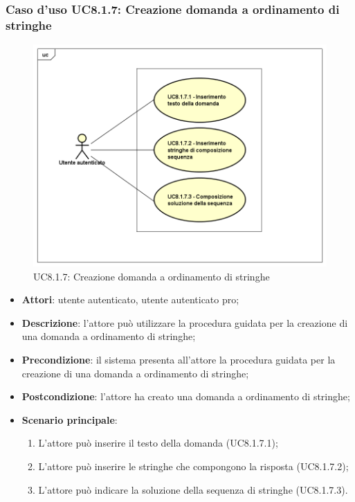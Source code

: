 \subsubsection{Caso d'uso UC8.1.7: Creazione domanda a ordinamento di stringhe}
	\label{UC8.1.7}
	\begin{figure}[h]
		\centering
			\includegraphics[scale=0.45,keepaspectratio]{UML/UC8_1_7.png}
		\caption{UC8.1.7: Creazione domanda a ordinamento di stringhe}
	\end{figure}
	\FloatBarrier
\begin{itemize}
	\item\textbf{Attori}: utente autenticato, utente autenticato pro;
	\item\textbf{Descrizione}: l'attore può utilizzare la procedura guidata per la creazione di una domanda a ordinamento di stringhe;
	\item \textbf{Precondizione}: il sistema presenta all'attore la procedura guidata per la creazione di una domanda a ordinamento di stringhe; 
	\item\textbf{Postcondizione}: l'attore ha creato una domanda a ordinamento di stringhe;
	\item\textbf{Scenario principale}:
		\begin{enumerate}
			\item L'attore può inserire il testo della domanda (UC8.1.7.1);
			\item L'attore può inserire le stringhe che compongono la risposta (UC8.1.7.2);
			\item L'attore può indicare la soluzione della sequenza di stringhe (UC8.1.7.3).
		\end{enumerate}
\end{itemize}

